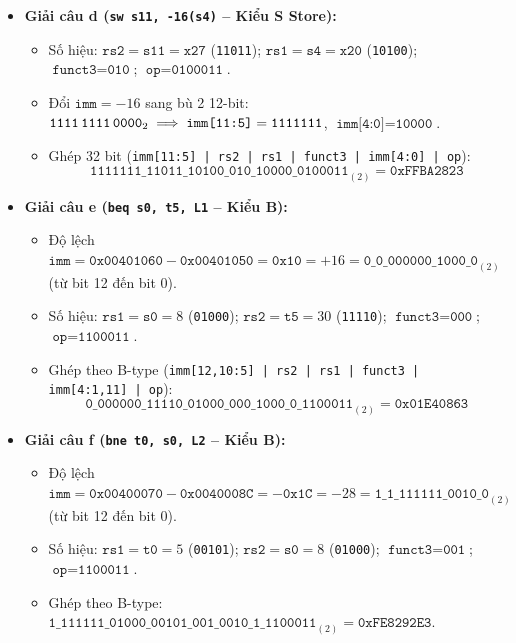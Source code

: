 \begin{itemize}
\begin{itemize}
    \end{itemize}
    \item \textbf{Giải câu d (\texttt{sw s11, -16(s4)} -- Kiểu S Store):}
    \begin{itemize}
        \item Số hiệu: $\texttt{rs2} = \texttt{s11} = \texttt{x27}$ (\texttt{11011}); $\texttt{rs1} = \texttt{s4} = \texttt{x20}$ (\texttt{10100}); $\texttt{funct3} = \texttt{010}$; $\texttt{op} = \texttt{0100011}$.
        \item Đổi $\texttt{imm} = -16$ sang bù 2 12-bit: $\texttt{1111\,1111\,0000}_2 \implies \texttt{imm[11:5]} = \texttt{1111111}$, $\texttt{imm[4:0]} = \texttt{10000}$.
        \item Ghép 32 bit (\texttt{imm[11:5] | rs2 | rs1 | funct3 | imm[4:0] | op}):
        $$\texttt{1111111\_11011\_10100\_010\_10000\_0100011}_{(2)} = \mathbf{\texttt{0xFFBA2823}}$$
    \end{itemize}
    \item \textbf{Giải câu e (\texttt{beq s0, t5, L1} -- Kiểu B):}
    \begin{itemize}
        \item Độ lệch $\texttt{imm} = \texttt{0x00401060} - \texttt{0x00401050} = \texttt{0x10} = +16 = \texttt{0\_0\_000000\_1000\_0}_{(2)}$ (từ bit 12 đến bit 0).
        \item Số hiệu: $\texttt{rs1} = \texttt{s0} = 8$ (\texttt{01000}); $\texttt{rs2} = \texttt{t5} = 30$ (\texttt{11110}); $\texttt{funct3} = \texttt{000}$; $\texttt{op} = \texttt{1100011}$.
        \item Ghép theo B-type (\texttt{imm[12,10:5] | rs2 | rs1 | funct3 | imm[4:1,11] | op}):
        $$\texttt{0\_000000\_11110\_01000\_000\_1000\_0\_1100011}_{(2)} = \mathbf{\texttt{0x01E40863}}$$
    \end{itemize}
    \item \textbf{Giải câu f (\texttt{bne t0, s0, L2} -- Kiểu B):}
    \begin{itemize}
        \item Độ lệch $\texttt{imm} = \texttt{0x00400070} - \texttt{0x0040008C} = -\texttt{0x1C} = -28 = \texttt{1\_1\_111111\_0010\_0}_{(2)}$ (từ bit 12 đến bit 0).
        \item Số hiệu: $\texttt{rs1} = \texttt{t0} = 5$ (\texttt{00101}); $\texttt{rs2} = \texttt{s0} = 8$ (\texttt{01000}); $\texttt{funct3} = \texttt{001}$; $\texttt{op} = \texttt{1100011}$.
        \item Ghép theo B-type: $\texttt{1\_111111\_01000\_00101\_001\_0010\_1\_1100011}_{(2)} = \mathbf{\texttt{0xFE8292E3}}$.

\end{itemize}
\end{itemize}
